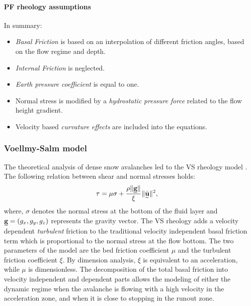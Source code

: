 \documentclass{article}
\begin{document}
\paragraph{PF rheology assumptions} In summary:
\begin{itemize}
\item \textit{Basal Friction} is based on an interpolation of different friction angles, based on the flow regime and depth.

\item \textit{Internal Friction} is neglected.

\item \textit{Earth pressure coefficient} is equal to one.

\item Normal stress is modified by a \textit{hydrostatic pressure force} related to the flow height gradient.

\item Velocity based \textit{curvature effects} are included into the equations.
\end{itemize}

\subsubsection{Voellmy-Salm model}\label{VSM}
The theoretical analysis of dense snow avalanches led to the VS rheology model \citep{Voellmy1955, Salm1993}. The following relation between shear and normal stresses holds:
\begin{equation}
\tau = \mu \sigma + \frac{\rho \| \underline{\textbf g} \|}{\xi} \| \underset{^\sim}{\bar{\textbf u}} \|^2,
\end{equation}
where, $\sigma$ denotes the normal stress at the bottom of the fluid layer and $\underline{\textbf g} = (g_{x} , g_{y} , g_{z})$ represents the gravity vector. The VS rheology adds a velocity dependent \emph{turbulent} friction to the traditional velocity independent basal friction term which is proportional to the normal stress at the flow bottom. The two parameters of the model are the bed friction coefficient $\mu$ and the turbulent friction coefficient $\xi$. By dimension analysis, $\xi$ is equivalent to an acceleration, while $\mu$ is dimensionless. The decomposition of the total basal friction into velocity independent and dependent parts allows the modeling of either the dynamic regime when the avalanche is flowing with a high velocity in the acceleration zone, and when it is close to stopping in the runout zone.
\end{document}
